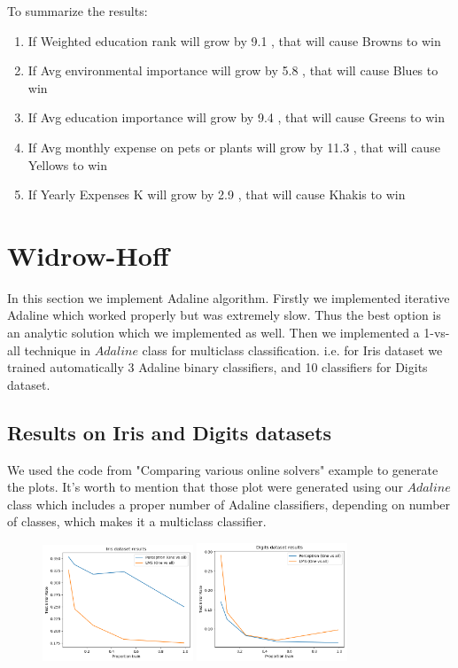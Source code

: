 \documentclass[12pt]{article}
\begin{document}
To summarize the results:

\begin{enumerate}

\item If Weighted education rank  will grow by  9.1 , that will cause  Browns  to win

\item If  Avg environmental importance  will grow by  5.8 , that will cause  Blues  to win

\item If  Avg education importance  will grow by  9.4 , that will cause  Greens  to win

\item If  Avg monthly expense on pets or plants will grow by  11.3 , that will cause  Yellows  to win

\item If  Yearly Expenses K  will grow by  2.9 , that will cause  Khakis  to win

\end{enumerate}

\newpage
\section{Widrow-Hoff}
In this section we implement Adaline algorithm. Firstly we implemented iterative Adaline which worked properly but was extremely slow. Thus the best option is an analytic solution which we implemented as well. Then we implemented a 1-vs-all technique in $Adaline$ class for multiclass classification. i.e. for Iris dataset we trained automatically 3 Adaline binary classifiers, and 10 classifiers for Digits dataset.
\subsection{Results on Iris and Digits datasets}
We used the code from "Comparing various online solvers" example to generate the plots. It's worth to mention that those plot were generated using our $Adaline$ class which includes a proper number of Adaline classifiers, depending on number of classes, which makes it a multiclass classifier. 
\begin{figure}[ht]
	\centering
	\includegraphics[width=0.4\textwidth]{weirdo_hoff_plots/iris}
	\includegraphics[width=0.4\textwidth]{weirdo_hoff_plots/digits}			
\end{figure}
\end{document}
